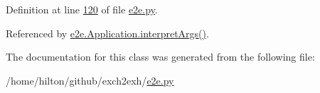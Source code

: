 Definition at line \hyperlink{e2e_8py_source_l00120}{120} of file \hyperlink{e2e_8py_source}{e2e.\+py}.



Referenced by \hyperlink{e2e_8py_source_l00167}{e2e.\+Application.\+interpret\+Args()}.



The documentation for this class was generated from the following file\+:\begin{DoxyCompactItemize}
\item 
/home/hilton/github/exch2exh/\hyperlink{e2e_8py}{e2e.\+py}\end{DoxyCompactItemize}
